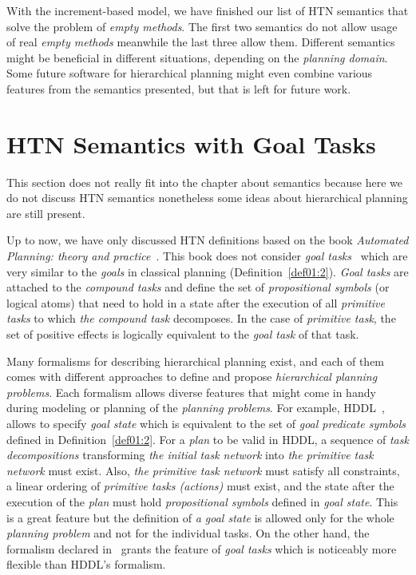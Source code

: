 \medskip\noindent
With the increment-based model, we have finished our list of HTN semantics that solve the problem of \emph{empty methods}. The first two semantics do not allow usage of real \emph{empty methods} meanwhile the last three allow them. Different semantics might be beneficial in different situations, depending on the \emph{planning domain}. Some future software for hierarchical planning might even combine various features from the semantics presented, but that is left for future work.
 
\section{{HTN} Semantics with Goal Tasks}

\medskip\noindent
This section does not really fit into the chapter about semantics because here we do not discuss HTN semantics nonetheless some ideas about hierarchical planning are still present.

\medskip\noindent
Up to now, we have only discussed HTN definitions based on the book \emph{Automated Planning: theory and practice}~\cite{nau}. This book does not consider \emph{goal tasks}~\cite{complexity} which are very similar to the \emph{goals} in classical planning (Definition~\ref{def01:2}). \emph{Goal tasks} are attached to the \emph{compound tasks} and define the set of \emph{propositional symbols} (or logical atoms) that need to hold in a state after the execution of all \emph{primitive tasks} to which \emph{the compound task} decomposes. In the case of \emph{primitive task}, the set of positive effects is logically equivalent to the \emph{goal task} of that task. 

\medskip\noindent
Many formalisms for describing hierarchical planning exist, and each of them comes with different approaches to define and propose \emph{hierarchical planning problems}. Each formalism allows diverse features that might come in handy during modeling or planning of the \emph{planning problems}. For example, HDDL~\cite{hddl}, allows to specify \emph{goal state} which is equivalent to the set of \emph{goal predicate symbols} defined in Definition~\ref{def01:2}. For a \emph{plan} to be valid in HDDL, a sequence of \emph{task decompositions} transforming \emph{the initial task network} into \emph{the primitive task network} must exist. Also, \emph{the primitive task network} must satisfy all constraints, a linear ordering of \emph{primitive tasks (actions)} must exist, and the state after the execution of the \emph{plan} must hold \emph{propositional symbols} defined in \emph{goal state}. This is a great feature but the definition of \emph{a goal state} is allowed only for the whole \emph{planning problem} and not for the individual tasks. On the other hand, the formalism declared in~\cite{complexity} grants the feature of \emph{goal tasks} which is noticeably more flexible than HDDL's formalism.


